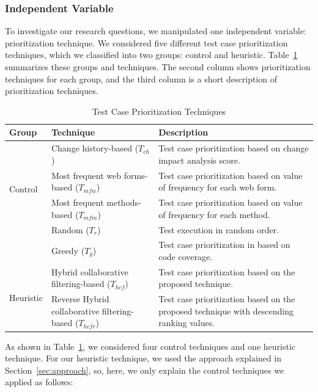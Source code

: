\subsubsection{Independent Variable}

To investigate our research questions, we manipulated one independent 
variable: prioritization technique. 
We considered five different test case prioritization techniques,
which we classified into two groups: control and heuristic.
Table~\ref{tab:techniques} summarizes these groups and techniques.
The second column shows prioritization techniques for each group, 
and the third column is a short description of prioritization techniques. 

\begin{table}[!ht]
\caption{Test Case Prioritization Techniques}
\vspace*{-10pt}
\begin{center}
\begin{tabular}{|l|l|l|}\hline
Group & Technique & Description \\ \hline
\multirow{4}{*}{Control} 
& Change history-based ($T_{ch}$) & Test case prioritization based on change impact analysis score.\\
& Most frequent web forms-based ($T_{mfw}$)&  Test case prioritization based on value of frequency for each web form.\\
& Most frequent methods-based ($T_{mfm}$) &  Test case prioritization based on value of frequency for each method.\\
& Random ($T_{r}$) &  Test execution in random order.\\	
& Greedy ($T_{g}$) &  Test case prioritization in based on code coverage.\\\hline			
\multirow{2}{*}{Heuristic} 
& Hybrid collaborative filtering-based ($T_{hcf}$)& Test case prioritization based on the proposed technique. \\
& Reverse Hybrid collaborative filtering-based ($T_{hcfr}$)& Test case prioritization based on the proposed technique with descending ranking values. \\\hline
\end{tabular}
\end {center}
\label{tab:techniques}
\vspace*{-5pt}
\end{table}

As shown in Table~\ref{tab:techniques}, we considered four control techniques and 
one heuristic technique. For our heuristic technique, we used the approach 
explained in Section~\ref{sec:approach},
so, here, we only explain the control techniques we applied as follows:

